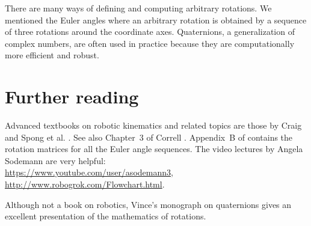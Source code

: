 There are many ways of defining and computing arbitrary rotations. We mentioned the Euler angles where an arbitrary rotation is obtained by a sequence of three rotations around the coordinate axes. Quaternions, a generalization of complex numbers, are often used in practice because they are computationally more efficient and robust.

\section{Further reading}

Advanced textbooks on robotic kinematics and related topics are those by Craig \cite{craig} and Spong et al. \cite{spong}. See also Chapter~3 of Correll \cite{correll}. Appendix~B of \cite{craig} contains the rotation matrices for all the Euler angle sequences. The video lectures by Angela Sodemann are very helpful:\\
\url{https://www.youtube.com/user/asodemann3},\\
\url{http://www.robogrok.com/Flowchart.html}.

Although not a book on robotics, Vince's monograph on quaternions \cite{vince} gives an excellent presentation of the mathematics of rotations.



